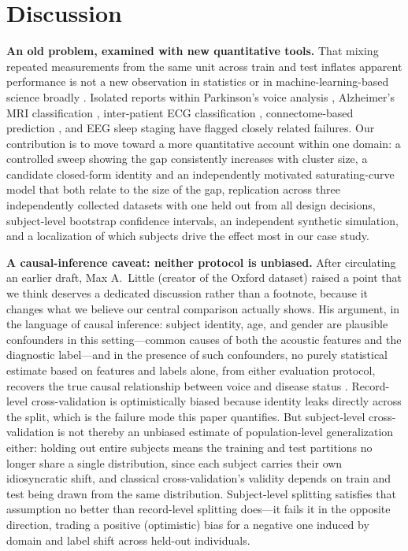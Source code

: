 \documentclass[11pt]{article}
\begin{document}
\section{Discussion}
\textbf{An old problem, examined with new quantitative tools.} That mixing repeated measurements from the same unit across train and test inflates apparent performance is not a new observation in statistics or in machine-learning-based science broadly \cite{kapoor2023}. Isolated reports within Parkinson's voice analysis \cite{omodunbi2025}, Alzheimer's MRI classification \cite{sifat2026}, inter-patient ECG classification \cite{dechazal2004}, connectome-based prediction \cite{rosenblatt2024}, and EEG sleep staging \cite{koksal2026} have flagged closely related failures. Our contribution is to move toward a more quantitative account within one domain: a controlled sweep showing the gap consistently increases with cluster size, a candidate closed-form identity and an independently motivated saturating-curve model that both relate to the size of the gap, replication across three independently collected datasets with one held out from all design decisions, subject-level bootstrap confidence intervals, an independent synthetic simulation, and a localization of which subjects drive the effect most in our case study.

\textbf{A causal-inference caveat: neither protocol is unbiased.} After circulating an earlier draft, Max A.\ Little (creator of the Oxford dataset) raised a point that we think deserves a dedicated discussion rather than a footnote, because it changes what we believe our central comparison actually shows. His argument, in the language of causal inference: subject identity, age, and gender are plausible confounders in this setting---common causes of both the acoustic features and the diagnostic label---and in the presence of such confounders, no purely statistical estimate based on features and labels alone, from either evaluation protocol, recovers the true causal relationship between voice and disease status \cite{pearl2009}. Record-level cross-validation is optimistically biased because identity leaks directly across the split, which is the failure mode this paper quantifies. But subject-level cross-validation is not thereby an unbiased estimate of population-level generalization either: holding out entire subjects means the training and test partitions no longer share a single distribution, since each subject carries their own idiosyncratic shift, and classical cross-validation's validity depends on train and test being drawn from the same distribution. Subject-level splitting satisfies that assumption no better than record-level splitting does---it fails it in the opposite direction, trading a positive (optimistic) bias for a negative one induced by domain and label shift across held-out individuals.
\end{document}
